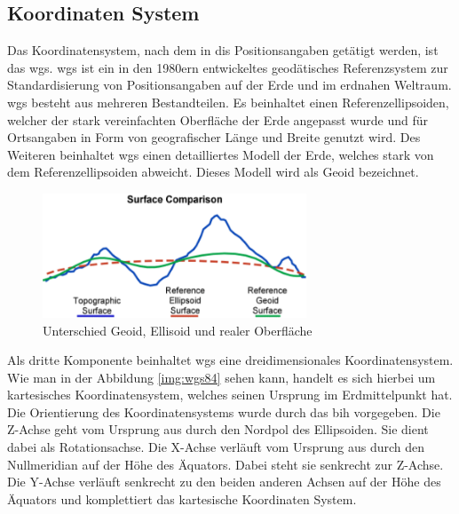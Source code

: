 \subsection{Koordinaten System}
Das Koordinatensystem, nach dem  in \ac{dis} Positionsangaben getätigt werden, ist das \ac{wgs}.
\ac{wgs} ist ein in den 1980ern entwickeltes geodätisches Referenzsystem zur Standardisierung von Positionsangaben auf der Erde und im erdnahen Weltraum.
\ac{wgs} besteht aus mehreren Bestandteilen. Es beinhaltet einen Referenzellipsoiden, welcher der stark vereinfachten Oberfläche der Erde angepasst wurde und für Ortsangaben in Form von geografischer Länge und Breite genutzt wird. Des Weiteren beinhaltet \ac{wgs} einen detailliertes Modell der Erde, welches stark von dem Referenzellipsoiden abweicht. Dieses Modell wird als Geoid bezeichnet. 
\begin{figure}[H]
	\centering
	\includegraphics[width=0.7\textwidth]{bilder/surfacecomparison.pdf}
	\caption{Unterschied Geoid, Ellisoid und realer Oberfläche \cite{UNAVCO.22.03.2018}}
	\label{img:oberflächenunterschied}
\end{figure}
Als dritte Komponente beinhaltet \ac{wgs} eine dreidimensionales Koordinatensystem.
Wie man in der Abbildung \ref{img:wgs84} sehen kann, handelt es sich hierbei um kartesisches Koordinatensystem, welches seinen Ursprung im Erdmittelpunkt hat. Die Orientierung des Koordinatensystems wurde durch das \ac{bih} vorgegeben. Die Z-Achse geht vom Ursprung aus durch den Nordpol des Ellipsoiden. Sie dient dabei als Rotationsachse. Die X-Achse verläuft vom Ursprung aus durch den Nullmeridian auf der Höhe des Äquators. Dabei steht sie senkrecht zur Z-Achse. Die Y-Achse verläuft senkrecht zu den beiden anderen Achsen auf der Höhe des Äquators und komplettiert das kartesische Koordinaten System. 

